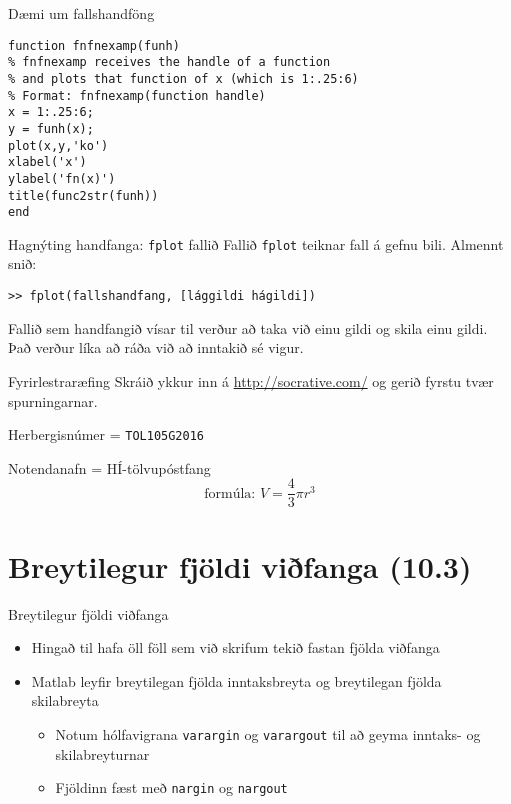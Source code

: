 \documentclass{beamer}
\begin{document}
\begin{frame}[fragile]{Dæmi um fallshandföng}
\begin{verbatim}
function fnfnexamp(funh)
% fnfnexamp receives the handle of a function
% and plots that function of x (which is 1:.25:6)
% Format: fnfnexamp(function handle)
x = 1:.25:6;
y = funh(x);
plot(x,y,'ko')
xlabel('x')
ylabel('fn(x)')
title(func2str(funh))
end
\end{verbatim}

\end{frame}

\begin{frame}[fragile]{Hagnýting handfanga: \texttt{fplot} fallið}
Fallið \texttt{fplot} teiknar fall á gefnu bili. Almennt snið:
\begin{verbatim}
>> fplot(fallshandfang, [lággildi hágildi])
\end{verbatim}
Fallið sem handfangið vísar til verður að taka við einu gildi og skila einu gildi. Það verður líka að ráða við að inntakið sé vigur.
\end{frame}

\begin{frame}{Fyrirlestraræfing}
Skráið ykkur inn á \url{http://socrative.com/} og gerið fyrstu tvær spurningarnar.

Herbergisnúmer = \texttt{TOL105G2016}

Notendanafn = HÍ-tölvupóstfang
\[
 \text{formúla: } V = \frac{4}{3} \pi r^3
\]
\end{frame}

\section{Breytilegur fjöldi viðfanga (10.3)}

\begin{frame}{Breytilegur fjöldi viðfanga}
\begin{itemize}
 \item Hingað til hafa öll föll sem við skrifum tekið fastan fjölda viðfanga
 \item Matlab leyfir breytilegan fjölda inntaksbreyta og breytilegan fjölda skilabreyta
 \begin{itemize}
  \item Notum hólfavigrana \texttt{varargin} og \texttt{varargout} til að geyma inntaks- og skilabreyturnar
  \item Fjöldinn fæst með \texttt{nargin} og \texttt{nargout}
 \end{itemize}
\end{itemize}
\end{frame}
\end{document}
